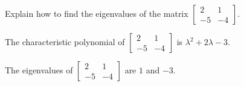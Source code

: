 
\begin{exerciseStatement}


Explain how to find the eigenvalues of the matrix \( \left[\begin{array}{cc}
2 & 1 \\
-5 & -4
\end{array}\right] \).


\end{exerciseStatement}
    
\begin{exerciseAnswer} 


The characteristic polynomial of \( \left[\begin{array}{cc}
2 & 1 \\
-5 & -4
\end{array}\right] \) is \( \lambda^{2} + 2 \lambda - 3 \).



The eigenvalues of \( \left[\begin{array}{cc}
2 & 1 \\
-5 & -4
\end{array}\right] \) are \( 1 \) and \( -3 \).


\end{exerciseAnswer}
    
